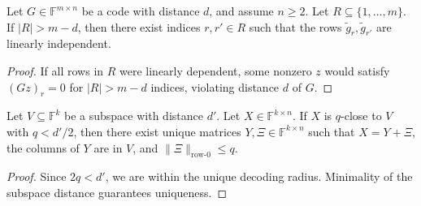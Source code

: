\begin{lemma}\label{lem:linear_independence_from_distance}\leanok {}
Let $G \in \mathbb{F}^{m \times n}$ be a code with distance $d$, and assume $n \ge 2$. Let $R \subseteq \{1, \ldots, m\}$.
If $|R| > m-d$, then there exist indices $r, r' \in R$ such that the rows $\tilde{g}_r, \tilde{g}_{r'}$ are linearly independent.
\end{lemma}
\begin{proof} \leanok
If all rows in $R$ were linearly dependent, some nonzero $z$ would satisfy $(Gz)_r = 0$ for $|R| > m-d$ indices, violating distance $d$ of $G$.
\end{proof}

\begin{lemma}\label{lem:unique_decoding_radius}\leanok {}
Let $V \subseteq \mathbb{F}^k$ be a subspace with distance $d'$. Let $X \in \mathbb{F}^{k \times n}$.
If $X$ is $q$-close to $V$ with $q < d'/2$, then there exist unique matrices $Y, \Xi \in \mathbb{F}^{k \times n}$ such that $X = Y + \Xi$, the columns of $Y$ are in $V$, and $\|\Xi\|_{\text{row-0}} \leq q$.
\end{lemma}
\begin{proof} \leanok
Since $2q < d'$, we are within the unique decoding radius. Minimality of the subspace distance guarantees uniqueness.
\end{proof}

